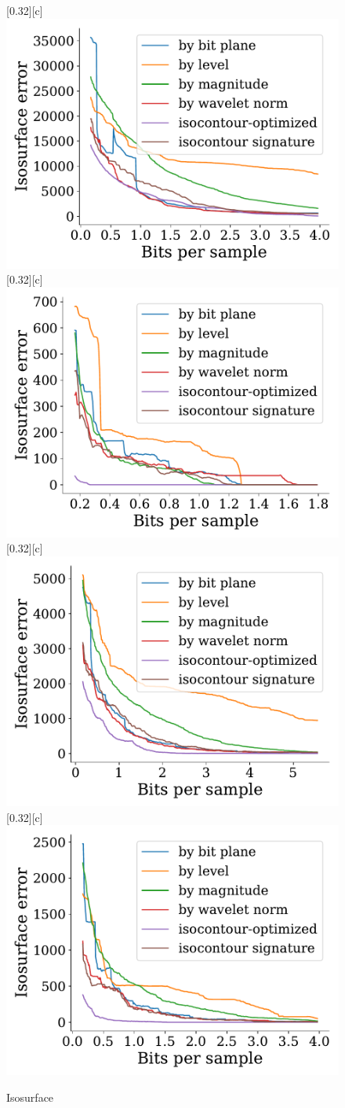 \documentclass{article}
\begin{document}
\begin{figure}[htb]
        [0.32\linewidth][c]{%
                \includegraphics[width=0.3\linewidth]{img/supplementary/isocontour-optimized-vismale}}
        [0.32\linewidth][c]{%
                \includegraphics[width=0.3\linewidth]{img/supplementary/isocontour-optimized-karfs}}
        [0.32\linewidth][c]{%
                \includegraphics[width=0.3\linewidth]{img/supplementary/isocontour-optimized-aneurism}}
        [0.32\linewidth][c]{%
                \includegraphics[width=0.3\linewidth]{img/supplementary/isocontour-optimized-velocityz}}
        \caption{Isosurface}
\end{figure}

\vspace{-1em}
\end{document}
